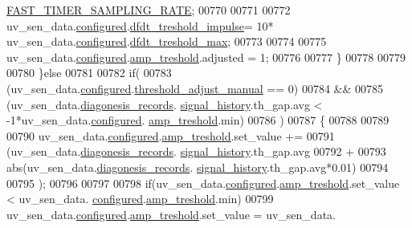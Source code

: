 \begin{DoxyCode}
      \hyperlink{a00021_a3a4dcb8af26a561d90607a41a3745806}{FAST\_TIMER\_SAMPLING\_RATE};
00770 
00771 
00772                      uv\_sen\_data.\hyperlink{a00035_a94b2d1f6ea4ab334c74d24984dd27843}{configured}.\hyperlink{a00021_a3b9c683370c94430a4c6a9d78ce6f5ef}{dfdt\_treshold\_impulse}= 10*
      uv\_sen\_data.\hyperlink{a00035_a94b2d1f6ea4ab334c74d24984dd27843}{configured}.\hyperlink{a00021_adf9a37828e447378b1d533185213316d}{dfdt\_treshold\_max};
00773 
00774 
00775                      uv\_sen\_data.\hyperlink{a00035_a94b2d1f6ea4ab334c74d24984dd27843}{configured}.\hyperlink{a00021_a4b3bbfb0267daea1432f2603825ade62}{amp\_treshold}.adjusted = 1;
00776 
00777                  \}
00778 
00779 
00780                 \}\textcolor{keywordflow}{else}
00781 
00782                 \textcolor{keywordflow}{if}(
00783                   (uv\_sen\_data.\hyperlink{a00035_a94b2d1f6ea4ab334c74d24984dd27843}{configured}.\hyperlink{a00021_a18e270a10094f045f20299b0f7e83085}{threshold\_adjust\_manual} == 0)
00784                     &&
00785                   (uv\_sen\_data.\hyperlink{a00035_a7ae905b560513ad201e58c2f63375030}{diagonesis\_records}.
      \hyperlink{a00017_affb63906d23cb1cb7787d61eaaedfb60}{signal\_history}.th\_gap.avg < -1*uv\_sen\_data.\hyperlink{a00035_a94b2d1f6ea4ab334c74d24984dd27843}{configured}.
      \hyperlink{a00021_a4b3bbfb0267daea1432f2603825ade62}{amp\_treshold}.min)
00786                   )
00787                   \{
00788 
00789 
00790                       uv\_sen\_data.\hyperlink{a00035_a94b2d1f6ea4ab334c74d24984dd27843}{configured}.\hyperlink{a00021_a4b3bbfb0267daea1432f2603825ade62}{amp\_treshold}.set\_value  +=
00791                          (uv\_sen\_data.\hyperlink{a00035_a7ae905b560513ad201e58c2f63375030}{diagonesis\_records}.
      \hyperlink{a00017_affb63906d23cb1cb7787d61eaaedfb60}{signal\_history}.th\_gap.avg
00792                           +
00793                          abs(uv\_sen\_data.\hyperlink{a00035_a7ae905b560513ad201e58c2f63375030}{diagonesis\_records}.
      \hyperlink{a00017_affb63906d23cb1cb7787d61eaaedfb60}{signal\_history}.th\_gap.avg*0.01)
00794 
00795                          );
00796 
00797 
00798                      \textcolor{keywordflow}{if}(uv\_sen\_data.\hyperlink{a00035_a94b2d1f6ea4ab334c74d24984dd27843}{configured}.\hyperlink{a00021_a4b3bbfb0267daea1432f2603825ade62}{amp\_treshold}.set\_value < uv\_sen\_data.
      \hyperlink{a00035_a94b2d1f6ea4ab334c74d24984dd27843}{configured}.\hyperlink{a00021_a4b3bbfb0267daea1432f2603825ade62}{amp\_treshold}.min)
00799                         uv\_sen\_data.\hyperlink{a00035_a94b2d1f6ea4ab334c74d24984dd27843}{configured}.\hyperlink{a00021_a4b3bbfb0267daea1432f2603825ade62}{amp\_treshold}.set\_value = uv\_sen\_data.

\end{DoxyCode}
